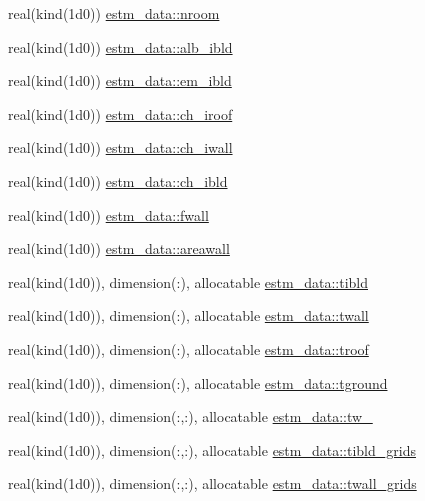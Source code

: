 \begin{DoxyCompactItemize}
\item 
real(kind(1d0)) \hyperlink{namespaceestm__data_a484d32bf82e9fbf6e99d5a867b09ebdf}{estm\+\_\+data\+::nroom}
\item 
real(kind(1d0)) \hyperlink{namespaceestm__data_a27342e25596431b642e42db136565905}{estm\+\_\+data\+::alb\+\_\+ibld}
\item 
real(kind(1d0)) \hyperlink{namespaceestm__data_aa8e01adad43973a11d6126e6c709092b}{estm\+\_\+data\+::em\+\_\+ibld}
\item 
real(kind(1d0)) \hyperlink{namespaceestm__data_aaad79d582a2d1bb00347adf79ad73de6}{estm\+\_\+data\+::ch\+\_\+iroof}
\item 
real(kind(1d0)) \hyperlink{namespaceestm__data_a3e846940895fc9898d7493ae053dae26}{estm\+\_\+data\+::ch\+\_\+iwall}
\item 
real(kind(1d0)) \hyperlink{namespaceestm__data_a9acac00707614f78bd70854d87bcc5de}{estm\+\_\+data\+::ch\+\_\+ibld}
\item 
real(kind(1d0)) \hyperlink{namespaceestm__data_a82d4728808abef718c63d66a77542383}{estm\+\_\+data\+::fwall}
\item 
real(kind(1d0)) \hyperlink{namespaceestm__data_a8537e873a1d20b585c3c9940de7645c7}{estm\+\_\+data\+::areawall}
\item 
real(kind(1d0)), dimension(\+:), allocatable \hyperlink{namespaceestm__data_ac5581091bba0f750cbe63327619693a5}{estm\+\_\+data\+::tibld}
\item 
real(kind(1d0)), dimension(\+:), allocatable \hyperlink{namespaceestm__data_a49312a4b669374fd5b4128e85f1d08b6}{estm\+\_\+data\+::twall}
\item 
real(kind(1d0)), dimension(\+:), allocatable \hyperlink{namespaceestm__data_a659039ba437449e2268beab9206c4bcf}{estm\+\_\+data\+::troof}
\item 
real(kind(1d0)), dimension(\+:), allocatable \hyperlink{namespaceestm__data_a31cf901029f7f3a0a3113c0e2dbd6d90}{estm\+\_\+data\+::tground}
\item 
real(kind(1d0)), dimension(\+:,\+:), allocatable \hyperlink{namespaceestm__data_a333d0455fbb31ea62671cae82d2f3da7}{estm\+\_\+data\+::tw\+\_}
\item 
real(kind(1d0)), dimension(\+:,\+:), allocatable \hyperlink{namespaceestm__data_a0779bf7064e6250f2aecbe275a47b0d6}{estm\+\_\+data\+::tibld\+\_\+grids}
\item 
real(kind(1d0)), dimension(\+:,\+:), allocatable \hyperlink{namespaceestm__data_ac581f9c4ab011d112e60e855c575f705}{estm\+\_\+data\+::twall\+\_\+grids}
\item 

\end{DoxyCompactItemize}
